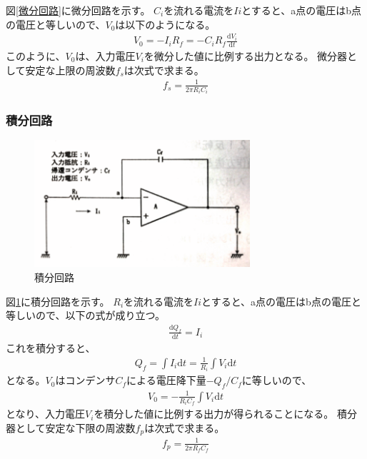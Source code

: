 \documentclass[a4paper,11pt,uplatex]{jsarticle}
\begin{document}
図\ref{微分回路}に微分回路を示す。
$C_i$を流れる電流を$Ii$とすると、a点の電圧はb点の電圧と等しいので、$V_0$は以下のようになる。
\begin{align}
  V_0 = -I_iR_f = -C_iR_f \frac{\mathrm{d} V_i}{\mathrm{d} t}
\end{align}
このように、$V_0$は、入力電圧$V_i$を微分した値に比例する出力となる。
微分器として安定な上限の周波数$f_s$は次式で求まる。
\begin{align}
  f_s = \frac{1}{2\pi R_iC_i}
\end{align}

\subsubsection{積分回路}

\begin{figure}[H]
	\begin{center}
		\includegraphics[width=8cm]{画像/積分回路.png}
		\caption{積分回路}
		\label{積分回路}
	\end{center}
\end{figure}

図\ref{積分回路}に積分回路を示す。
$R_i$を流れる電流を$Ii$とすると、a点の電圧はb点の電圧と等しいので、以下の式が成り立つ。
\begin{align}
  \frac{\mathrm{d}Q_f}{\mathrm{d}t} = I_i
\end{align}
これを積分すると、
\begin{align}
  Q_f = \int I_i \mathrm{d}t = \frac{1}{R_i}\int V_i \mathrm{d}t
\end{align}
となる。$V_0$はコンデンサ$C_f$による電圧降下量$-Q_f/C_f$に等しいので、
\begin{align}
  V_0 = -\frac{1}{R_iC_f}\int V_i\mathrm{d}t
\end{align}
となり、入力電圧$V_i$を積分した値に比例する出力が得られることになる。
積分器として安定な下限の周波数$f_p$は次式で求まる。
\begin{align}
  f_p = \frac{1}{2\pi R_fC_f}
\end{align}
\end{document}
